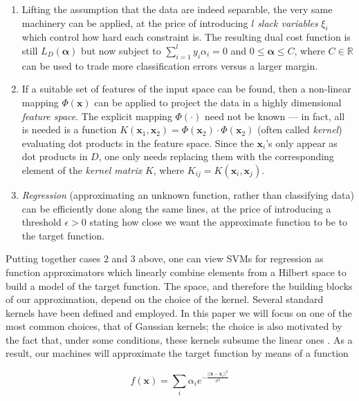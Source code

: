 \documentclass[conference]{IEEEtran}
\def\RR{\mathbb{R}}
\def\xx{\mathbf{x}}
\def\aa{\boldsymbol{\alpha}}
\begin{document}
\begin{enumerate}

  \item Lifting the assumption that the data are indeed separable, the
    very same machinery can be applied, at the price of introducing
    $l$ \emph{slack variables} $\xi_i$ which control how hard each
    constraint is. The resulting dual cost function is still
    $L_D(\aa)$ but now subject to $\sum_{i=1}^{l} y_i\alpha_i = 0$ and
    $0 \leq \aa \leq C$, where $C \in \RR$ can be used to trade more
    classification errors versus a larger margin.

  \item If a suitable set of features of the input space can be found,
    then a non-linear mapping $\Phi(\xx)$ can be applied to project
    the data in a highly dimensional \emph{feature space}. The
    explicit mapping $\Phi(\cdot)$ need not be known --- in fact, all
    is needed is a function
    $K(\xx_1,\xx_2)=\Phi(\xx_2)\cdot\Phi(\xx_2)$ (often called
    \emph{kernel}) evaluating dot products in the feature space. Since
    the $\xx_i$'s only appear as dot products in $D$, one only needs
    replacing them with the corresponding element of the \emph{kernel
    matrix} $K$, where $K_{ij} = K(\xx_i,\xx_j)$.

  \item \emph{Regression} (approximating an unknown function, rather
    than classifying data) can be efficiently done along the same
    lines, at the price of introducing a threshold $\epsilon>0$
    stating how close we want the approximate function to be to the
    target function.

\end{enumerate}

Putting together cases $2$ and $3$ above, one can view SVMs for
regression as function approximators which linearly combine elements
from a Hilbert space to build a model of the target function. The
space, and therefore the building blocks of our approximation, depend
on the choice of the kernel. Several standard kernels have been
defined and employed. In this paper we will focus on one of the most
common choices, that of Gaussian kernels; the choice is also motivated
by the fact that, under some conditions, these kernels subsume the
linear ones \cite{KLAsympt}. As a result, our machines will
approximate the target function by means of a function

$$ f(\xx) = \sum_{i} \alpha_i e^{-\frac{||\xx-\xx_i||^2}{\sigma^2}} $$
\end{document}
